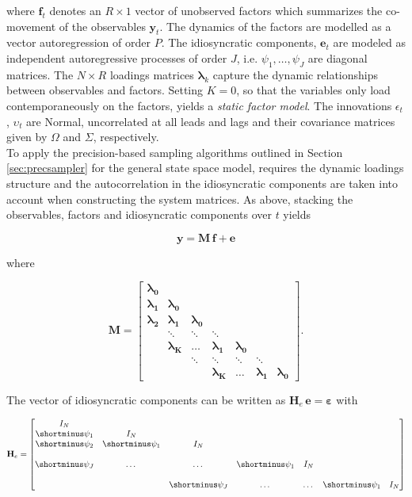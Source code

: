 \documentclass[notitlepage,a4paper,12pt]{article}
\begin{document}
where $\mathbf{f}_t$ denotes an $R \times 1$ vector of unobserved factors which summarizes the co-movement of the observables $\mathbf{y}_t$. The dynamics of the factors are modelled as a vector autoregression of order $P$. The idiosyncratic components, $\mathbf{e}_t$ are modeled as independent autoregressive processes of order $J$, i.e. $\psi_1, \dots, \psi_J$ are diagonal matrices. The $N \times R$ loadings matrices $\mathbf{\lambda}_k$ capture the dynamic relationships between observables and factors. Setting $K=0$, so that the variables only load contemporaneously on the factors, yields a \textit{static factor model}. The innovations $\epsilon_t$, $\upsilon_t$ are Normal, uncorrelated at all leads and lags and their covariance matrices given by $\Omega$ and $\Sigma$, respectively. \\

To apply the precision-based sampling algorithms outlined in Section \ref{sec:precsampler} for the general state space model, requires the dynamic loadings structure and the autocorrelation in the idiosyncratic components are taken into account when constructing the system matrices. As above, stacking the observables, factors and idiosyncratic components over $t$ yields 

\begin{equation}
    \mathbf{y} = \mathbf{M} \, \mathbf{f} + \mathbf{e}
\end{equation} 

\noindent where 

$$
\mathbf{M}
=
\begin{bmatrix}
    \boldsymbol{\lambda_0} &   \\
    \boldsymbol{\lambda_1} & \boldsymbol{\lambda_0}   \\
    \boldsymbol{\lambda_2} & \boldsymbol{\lambda_1} & \boldsymbol{\lambda_0} \\
     & \ddots & \ddots & \ddots \\
     & \boldsymbol{\lambda_K} &\dots & \boldsymbol{\lambda_1} & \boldsymbol{\lambda_0}
     &  \\
     & & \ddots & \ddots & \ddots & \ddots \\
    & & & \boldsymbol{\lambda_K} &\dots & \boldsymbol{\lambda_1} & \boldsymbol{\lambda_0}
\end{bmatrix}.
$$

The vector of idiosyncratic components can be written as $\mathbf{H}_e\, \mathbf{e} = \boldsymbol{\varepsilon}$ with 

$$
\mathbf{H}_e
=
\begin{bmatrix}
    I_N &  \\
    \shortminus \psi_1 & I_N &  \\
    \shortminus \psi_2 & \shortminus \psi_1 & I_N &  \\
     &  &  &  &  & \\
    \shortminus \psi_J & \dots & \dots & \shortminus \psi_1 & I_N \\
     &  &  &  &  & \\
    & & \shortminus \psi_J & \dots & \dots & \shortminus \psi_1 & I_N
\end{bmatrix}
$$
\end{document}
